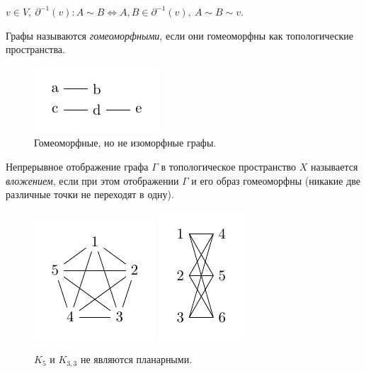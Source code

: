 $v \in V, \ \partial^{-1}(v): A \sim B \Longleftrightarrow A, B \in \partial^{-1}(v), \ A \sim B \sim v$.

\begin{definition}
    Графы называются \textit{гомеоморфными}, если они гомеоморфны как топологические пространства.
\end{definition}

\begin{figure}[h]
    \centering
    \includegraphics[scale=2]{images/c3.3.pdf}
    \caption{Гомеоморфные, но не изоморфные графы.}
    \label{fig:c3.3}
\end{figure}

\begin{definition}
    Непрерывное отображение графа $\Gamma$ в топологическое пространство $X$ называется \textit{вложением}, если при этом отображении $\Gamma$ и его образ гомеоморфны (никакие две различные точки не переходят в одну).
\end{definition}

\begin{figure}[h]
    \centering
    \includegraphics[scale=2]{images/c3.4.1.pdf}
    \includegraphics[scale=2]{images/c3.4.2.pdf}
    \caption{$K_5$ и $K_{3,3}$ не являются планарными.}
    \label{fig:c3.4.1,2}
\end{figure}

